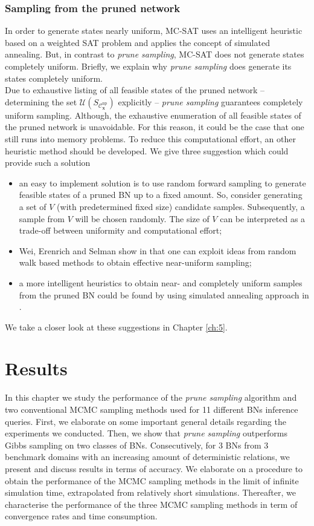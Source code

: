 \documentclass[a4paper, twoside, 11pt]{report}
\newcommand{\bfx}{{\mathbf{x}}}
\newcommand{\C}{{\mathcal C}}
\newcommand{\U}{{\mathcal{U}}}
\theoremstyle{plain}
\theoremstyle{definition}
\theoremstyle{remark}
\newcommand{\ps}{\textit{prune sampling }}
\begin{document}
\subsection{Sampling from the pruned network}\label{sec:sampling_uni}
In order to generate states nearly uniform, MC-SAT uses an intelligent heuristic \cite{wei2004towards} based on a weighted SAT problem and applies the concept of simulated annealing. But, in contrast to \textit{prune sampling}, MC-SAT does not generate states completely uniform. Briefly, we explain why \ps does generate its states completely uniform.\\

Due to exhaustive listing of all feasible states of the pruned network -- determining the set $\U(S_{\C_\bfx^{\text{np}}})$ explicitly -- \ps guarantees completely uniform sampling. Although, the exhaustive enumeration of all feasible states of the pruned network is unavoidable. For this reason, it could be the case that one still runs into memory problems. To reduce this computational effort, an other heuristic method should be developed. We give three suggestion which could provide such a solution
\begin{itemize}
\item an easy to implement solution is to use random forward sampling to generate feasible states of a pruned BN up to a fixed amount. So, consider generating a set of $V$ (with predetermined fixed size) candidate samples. Subsequently, a sample from $V$ will be chosen randomly. The size of $V$ can be interpreted as a trade-off between uniformity and computational effort;
\item Wei, Erenrich and Selman show in \cite{wei2004towards} that one can exploit ideas from random walk based methods to obtain effective near-uniform sampling;
\item a more intelligent heuristics to obtain near- and completely uniform samples from the pruned BN could be found by using simulated annealing approach in \cite{wei2004towards}.
\end{itemize}
We take a closer look at these suggestions in Chapter \ref{ch:5}.



\chapter{Results}
In this chapter we study the performance of the \ps algorithm and two conventional MCMC sampling methods used for 11 different BNs inference queries. First, we elaborate on some important general details regarding the experiments we conducted. Then, we show that \ps outperforms Gibbs sampling on two classes of BNs. Consecutively, for 3 BNs from 3 benchmark domains with an increasing amount of deterministic relations, we present and discuss results in terms of accuracy. We elaborate on a procedure to obtain the performance of the MCMC sampling methods in the limit of infinite simulation time, extrapolated from relatively short simulations. Thereafter, we characterise the performance of the three MCMC sampling methods in term of convergence rates and time consumption. 
\end{document}
